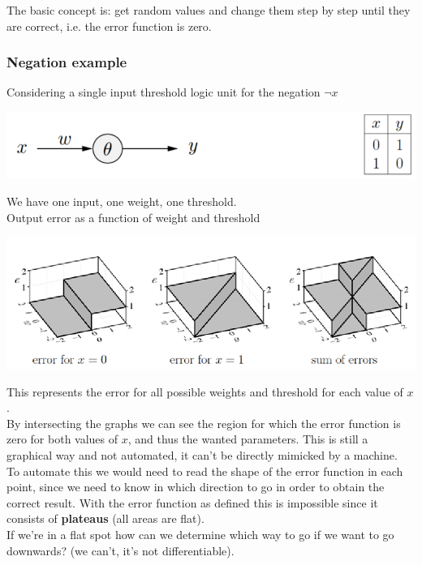 \documentclass[11pt]{article}
\begin{document}
		The basic concept is: get random values and change them step by step until they are correct, i.e. the error function is zero.\\
		
		\newpage
		
		\subsubsection{Negation example}
		Considering a single input threshold logic unit for the negation $\neg x$
		\begin{center}
			\includegraphics[width=0.85\columnwidth]{img/NN/TLU10}
		\end{center}
		We have one input, one weight, one threshold.\\
		
		Output error as a function of weight and threshold
		\begin{center}
			\includegraphics[width=0.85\columnwidth]{img/NN/error1}
		\end{center}
		This represents the error for all possible weights and threshold for each value of $x$.\\
		
		By intersecting the graphs we can see the region for which the error function is zero for both values of $x$, and thus the wanted parameters. This is still a graphical way and not automated, it can't be directly mimicked by a machine.\\
		
		To automate this we would need to read the shape of the error function in each point, since we need to know in which direction to go in order to obtain the correct result. With the error function as defined this is impossible since it consists of \textbf{plateaus} (all areas are flat). \\
		If we're in a flat spot how can we determine which way to go if we want to go downwards? (we can't, it's not differentiable).\\
		
\end{document}
